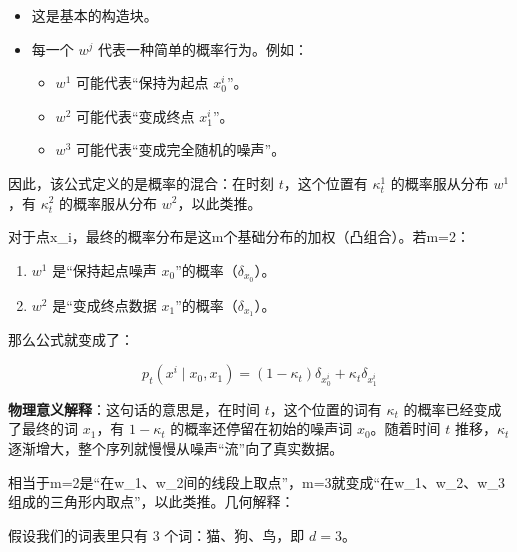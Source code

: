 \begin{itemize}
\tightlist
\item
  这是基本的构造块。
\item
{}
  每一个 \(w^j\) 代表一种简单的概率行为。例如：

  \begin{itemize}
  \tightlist
  \item
    \(w^1\) 可能代表``保持为起点 \(x_0^i\)''。
  \item
    \(w^2\) 可能代表``变成终点 \(x_1^i\)''。
  \item
    \(w^3\) 可能代表``变成完全随机的噪声''。
  \end{itemize}
\end{itemize}

因此，该公式定义的是概率的混合：在时刻 \(t\)，这个位置有 \(\kappa_t^1\) 的概率服从分布 \(w^1\)，有 \(\kappa_t^2\) 的概率服从分布 \(w^2\)，以此类推。

对于点x\_i，最终的概率分布是这m个基础分布的加权（凸组合）。若m=2：

\begin{enumerate}
\def\labelenumi{\arabic{enumi}.}
\tightlist
\item
  \(w^1\) 是``保持起点噪声 \(x_0\)''的概率（\(\delta_{x_0}\)）。
\item
  \(w^2\) 是``变成终点数据 \(x_1\)''的概率（\(\delta_{x_1}\)）。
\end{enumerate}

那么公式就变成了：

\[
p_t(x^i\mid x_0,x_1)=(1-\kappa_t)\delta_{x_0^i}+\kappa_t\delta_{x_1^i}
\]

\textbf{物理意义解释}：这句话的意思是，在时间 \(t\)，这个位置的词有 \(\kappa_t\) 的概率已经变成了最终的词 \(x_1\)，有 \(1-\kappa_t\) 的概率还停留在初始的噪声词 \(x_0\)。随着时间 \(t\) 推移，\(\kappa_t\) 逐渐增大，整个序列就慢慢从噪声``流''向了真实数据。

相当于m=2是``在w\_1、w\_2间的线段上取点''，m=3就变成``在w\_1、w\_2、w\_3组成的三角形内取点''，以此类推。几何解释：

假设我们的词表里只有 3 个词：猫、狗、鸟，即 \(d=3\)。

